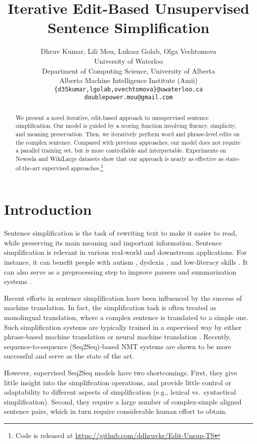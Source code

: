 \documentclass[11pt,a4paper]{article}
\title{Iterative Edit-Based Unsupervised Sentence Simplification}
\author{Dhruv Kumar, Lili Mou, Lukasz Golab, Olga Vechtomova\\
  University of Waterloo \\
  Department of Computing Science, University of Alberta\\ Alberta Machine Intelligence Institute (Amii)\\
  \texttt{\{d35kumar,lgolab,ovechtomova\}@uwaterloo.ca} \\
  \texttt{doublepower.mou@gmail.com}}
\date{}
\begin{document}
\maketitle
\begin{abstract}
We present a novel {iterative}, edit-based approach to unsupervised sentence simplification. Our model is guided by a scoring function involving fluency, simplicity, and meaning preservation. Then, we iteratively perform word and phrase-level edits on the complex sentence. Compared with previous approaches, our model does not require a parallel training set, but is more controllable and interpretable. Experiments on  Newsela and WikiLarge datasets show that our approach is nearly as effective as state-of-the-art supervised approaches.\footnote{Code is released at \url{https://github.com/ddhruvkr/Edit-Unsup-TS}}
\end{abstract}

\section{Introduction}

Sentence simplification is the task of rewriting text to make it easier to read, while preserving its main meaning and important information. 
Sentence simplification is relevant in various real-world and downstream applications.
For instance, it can benefit people with autism \cite{evans2014evaluation},
 dyslexia \cite{rello2013dyswebxia}, and  low-literacy skills \cite{watanabe2009facilita}.
It can also serve as a preprocessing step to improve parsers \cite{chandrasekar-etal-1996-motivations}
and summarization systems \cite{klebanov2004text}.


Recent efforts in sentence simplification have been influenced by the success of machine translation. In fact, the simplification task is often treated as monolingual translation, where a complex sentence is translated to a simple one. Such simplification systems are typically trained in a supervised way by either phrase-based machine translation \cite[PBMT,][]{wubben2012sentence, narayan2014hybrid, xu-etal-2016-optimizing} or neural machine translation  \cite[NMT,][]{zhang2017sentence, guo2018dynamic, kriz2019complexity}. Recently, sequence-to-sequence (Seq2Seq)-based NMT systems are
shown to be more successful and serve as the state of the art. 


However, supervised Seq2Seq models have two shortcomings. First, they give little insight into the simplification operations, and provide little control or adaptability to different aspects of simplification (e.g., lexical vs.~syntactical simplification).
Second, they require a large number of complex-simple aligned sentence pairs, which in turn require considerable human effort to obtain.
\end{document}
